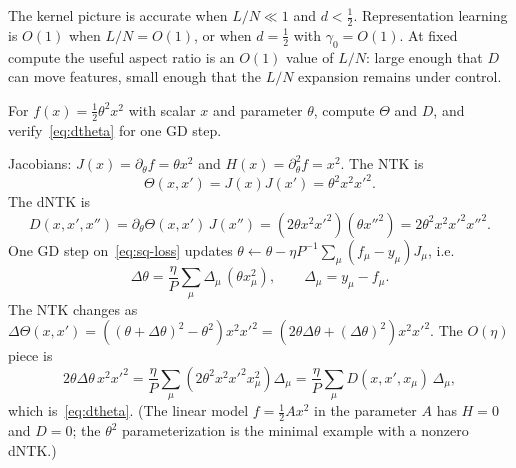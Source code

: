 The kernel picture is accurate when $L/N\ll 1$ and $d<\tfrac12$. Representation learning is $O(1)$ when $L/N=O(1)$, or when $d=\tfrac12$ with $\gamma_0=O(1)$. At fixed compute the useful aspect ratio is an $O(1)$ value of $L/N$: large enough that $D$ can move features, small enough that the $L/N$ expansion remains under control.

\begin{exercise}
For $f(x)=\tfrac12\theta^2 x^2$ with scalar $x$ and parameter $\theta$, compute $\Theta$ and $D$, and verify~\eqref{eq:dtheta} for one GD step.
\end{exercise}
\begin{solution}
Jacobians: $J(x)=\partial_\theta f=\theta x^2$ and $H(x)=\partial_\theta^2 f=x^2$. The NTK is
\[
  \Theta(x,x')=J(x)J(x')=\theta^2 x^2 x'^2.
\]
The dNTK is
\[
  D(x,x',x'')
  =\partial_\theta\Theta(x,x')\,J(x'')
  =(2\theta x^2 x'^2)(\theta x''^2)
  =2\theta^2 x^2 x'^2 x''^2.
\]
One GD step on~\eqref{eq:sq-loss} updates $\theta\leftarrow\theta-\eta P^{-1}\sum_\mu(f_\mu-y_\mu)J_\mu$, i.e.
\[
  \Delta\theta
  =\frac{\eta}{P}\sum_{\mu}\Delta_\mu\,(\theta x_\mu^2),
  \qquad \Delta_\mu=y_\mu-f_\mu.
\]
The NTK changes as $\Delta\Theta(x,x')=((\theta+\Delta\theta)^2-\theta^2)x^2 x'^2=(2\theta\Delta\theta+(\Delta\theta)^2)x^2 x'^2$. The $O(\eta)$ piece is
\[
  2\theta\Delta\theta\, x^2 x'^2
  =\frac{\eta}{P}\sum_{\mu}(2\theta^2 x^2 x'^2 x_\mu^2)\Delta_\mu
  =\frac{\eta}{P}\sum_{\mu} D(x,x',x_\mu)\,\Delta_\mu,
\]
which is~\eqref{eq:dtheta}. (The linear model $f=\tfrac12 A x^2$ in the parameter $A$ has $H=0$ and $D=0$; the $\theta^2$ parameterization is the minimal example with a nonzero dNTK.)
\end{solution}
